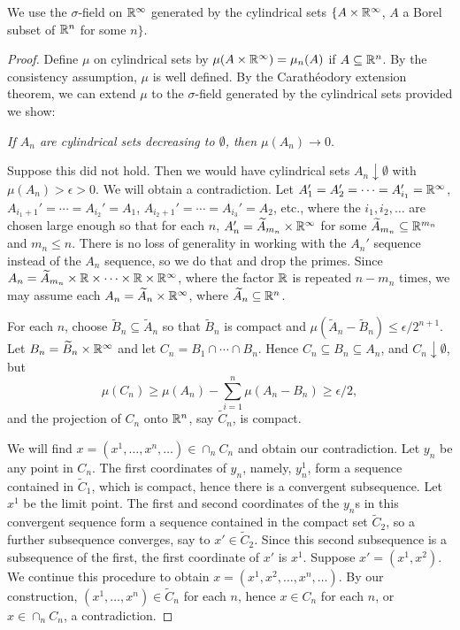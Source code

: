We use the $\sigma$-field on $\mathbb{R}^\infty$ generated by the cylindrical sets $\{A \times \mathbb{R}^\infty$, $A$ a Borel subset of $\mathbb{R}^n$ for some $n\}$.

\begin{proof}
Define $\mu$ on cylindrical sets by $\mu(A \times \mathbb{R}^\infty) = \mu_n(A)$ if $A \subseteq \mathbb{R}^n$. By the consistency assumption, $\mu$ is well defined. By the Carath\'eodory extension theorem, we can extend $\mu$ to the $\sigma$-field generated by the cylindrical sets provided we show:
\begin{obs}\label{obs:ch1_3.16}
\textit{If $A_n$  are cylindrical sets decreasing to $\emptyset$, then $\mu(A_n) \to 0$}.
\end{obs}

Suppose this did not hold. Then we would have cylindrical sets $A_n \downarrow \emptyset$ with $\mu(A_n) > \epsilon > 0$. We will obtain a contradiction. Let $A_1' = A_2' =\cdots=A_{i_1}' = \mathbb{R}^{\infty}$, $A_{i_1+1}' = \cdots = A_{i_2}' = A_1$, $A_{i_2+1}' = \cdots = A_{i_3}' = A_2$, etc., where the $i_1,i_2,\ldots$ are chosen large enough so that for each $n$, $A_n' = \widetilde{A}_{m_n} \times \mathbb{R}^\infty$ for some $\widetilde{A}_{m_n} \subseteq \mathbb{R}^{m_n}$ and $m_n \leq n$. There is no loss of generality in working with the $A_n'$ sequence instead of the $A_n$ sequence, so we do that and drop the primes. Since $A_n = \widetilde{A}_{m_n} \times \mathbb{R} \times \cdots \times \mathbb{R} \times \mathbb{R}^\infty$, where the factor $\mathbb{R}$ is repeated $n-m_n$ times, we may assume each $A_n = \widetilde{A}_n \times \mathbb{R}^\infty$, where $\widetilde{A}_n \subseteq \mathbb{R}^n$.

\mpagebreak

For each $n$, choose $\widetilde{B}_n \subseteq \widetilde{A}_n$ so that $\widetilde{B}_n$ is compact and $\mu(\widetilde{A}_n - \widetilde{B}_n) \leq \epsilon/2^{n+1}$. Let $B_n = \widetilde{B}_n \times \mathbb{R}^\infty$ and let $C_n = B_1 \cap \cdots \cap B_n$. Hence $C_n \subseteq B_n \subseteq A_n$, and $C_n \downarrow \emptyset$, but
\[
    \mu(C_n) \geq \mu(A_n) - \sum_{i=1}^n \mu(A_n - B_n) \geq \epsilon/2,
\]
and the projection of $C_n$ onto $\mathbb{R}^n$, say $\widetilde{C}_n$, is compact.

We will find $x = (x^1,\ldots,x^n,\ldots) \in \cap_n C_n$ and obtain our contradiction. Let $y_n$ be any point in $C_n$. The first coordinates of $y_n$, namely, $y_n^1$, form a sequence contained in $\widetilde{C}_1$, which is compact, hence there is a convergent subsequence. Let $x^1$ be the limit point. The first and second coordinates of the $y_n$s in this convergent sequence form a sequence contained in the compact set $\widetilde{C}_2$, so a further subsequence converges, say to $x' \in \widetilde{C}_2$. Since this second subsequence is a subsequence of the first, the first coordinate of $x'$ is $x^1$. Suppose $x' = (x^1,x^2)$. We continue this procedure to obtain $x = (x^1,x^2,\ldots,x^n,\ldots)$. By our construction, $(x^1,\ldots,x^n) \in \widetilde{C}_n$ for each $n$, hence $x \in C_n$ for each $n$, or $x \in \cap_n C_n$, a contradiction.
\end{proof}

